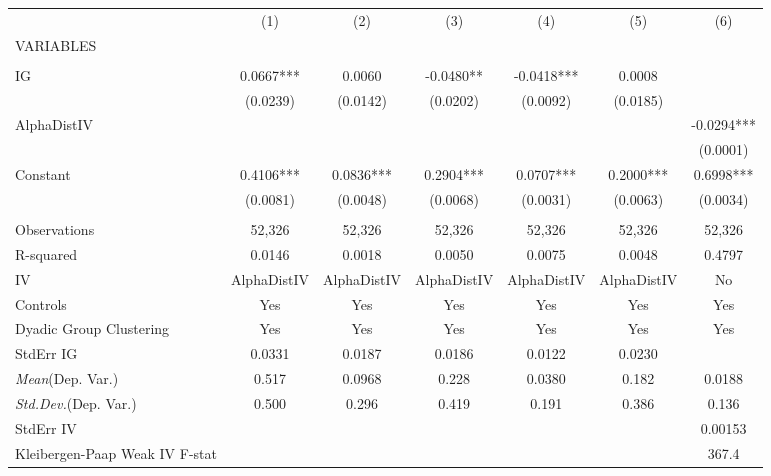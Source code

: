 \documentclass[]{article}
\begin{document}
\begin{tabular}{lcccccc} \hline
 & (1) & (2) & (3) & (4) & (5) & (6) \\
VARIABLES &  &  &  &  &  &  \\ \hline
 &  &  &  &  &  &  \\
IG & 0.0667*** & 0.0060 & -0.0480** & -0.0418*** & 0.0008 &  \\
 & (0.0239) & (0.0142) & (0.0202) & (0.0092) & (0.0185) &  \\
AlphaDistIV &  &  &  &  &  & -0.0294*** \\
 &  &  &  &  &  & (0.0001) \\
Constant & 0.4106*** & 0.0836*** & 0.2904*** & 0.0707*** & 0.2000*** & 0.6998*** \\
 & (0.0081) & (0.0048) & (0.0068) & (0.0031) & (0.0063) & (0.0034) \\
 &  &  &  &  &  &  \\
Observations & 52,326 & 52,326 & 52,326 & 52,326 & 52,326 & 52,326 \\
R-squared & 0.0146 & 0.0018 & 0.0050 & 0.0075 & 0.0048 & 0.4797 \\
IV & AlphaDistIV & AlphaDistIV & AlphaDistIV & AlphaDistIV & AlphaDistIV & No \\
Controls & Yes & Yes & Yes & Yes & Yes & Yes \\
Dyadic Group Clustering & Yes & Yes & Yes & Yes & Yes & Yes \\
StdErr IG & 0.0331 & 0.0187 & 0.0186 & 0.0122 & 0.0230 &  \\
\textit{Mean}(Dep. Var.) & 0.517 & 0.0968 & 0.228 & 0.0380 & 0.182 & 0.0188 \\
\textit{Std.Dev.}(Dep. Var.) & 0.500 & 0.296 & 0.419 & 0.191 & 0.386 & 0.136 \\
StdErr IV &  &  &  &  &  & 0.00153 \\
 Kleibergen-Paap Weak IV F-stat &  &  &  &  &  & 367.4 \\ \hline
\end{tabular}
\end{document}
